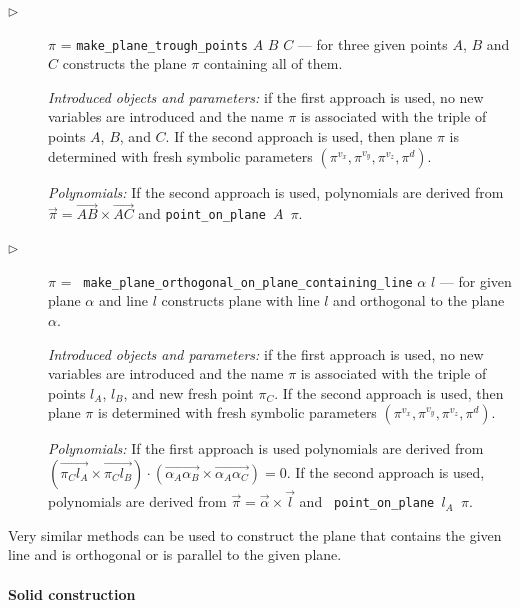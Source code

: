 \documentclass[final,1p,times,authoryear]{elsarticle}
\begin{document}
\begin{description}
\item[$\triangleright$] $\pi$ = {\tt make\_plane\_trough\_points} $A$
  $B$ $C$ --- for three given points $A$, $B$ and $C$ constructs the
  plane $\pi$ containing all of them.

  {\em Introduced objects and parameters:} if the first approach is
  used, no new variables are introduced and the name $\pi$ is
  associated with the triple of points $A$, $B$, and $C$. If the
  second approach is used, then plane $\pi$ is determined with fresh
  symbolic parameters $(\pi^{v_x}, \pi^{v_y}, \pi^{v_z}, \pi^{d})$.

  {\em Polynomials:} If the second approach is used, polynomials are
  derived from
  $\overrightarrow{\pi} = \overrightarrow{AB} \times
  \overrightarrow{AC}$ and {\tt point\_on\_plane $A$ $\pi$}.


\item[$\triangleright$] $\pi$ = {\tt
    make\_plane\_orthogonal\_on\_plane\_containing\_line} $\alpha$ $l$
  --- for given plane $\alpha$ and line $l$ constructs plane with line
  $l$ and orthogonal to the plane $\alpha$.

  {\em Introduced objects and parameters:} if the first approach is
  used, no new variables are introduced and the name $\pi$ is
  associated with the triple of points $l_A$, $l_B$, and new fresh
  point $\pi_C$. If the second approach is used, then plane $\pi$ is
  determined with fresh symbolic parameters
  $(\pi^{v_x}, \pi^{v_y}, \pi^{v_z}, \pi^{d})$.

  {\em Polynomials:} If the first approach is used polynomials are
  derived from $(\overrightarrow{\pi_Cl_A} \times
  \overrightarrow{\pi_Cl_B}) \cdot (\overrightarrow{\alpha_A\alpha_B}
  \times \overrightarrow{\alpha_A\alpha_C}) = 0$. If the second
  approach is used, polynomials are derived from $\overrightarrow{\pi}
  = \overrightarrow{\alpha} \times \overrightarrow{l}$ and {\tt
    point\_on\_plane $l_A$ $\pi$}.

\end{description}

Very similar methods can be used to construct the plane that contains
the given line and is orthogonal or is parallel to the given plane.

\paragraph{Solid construction}
\label{objectconstruction}
\end{document}
